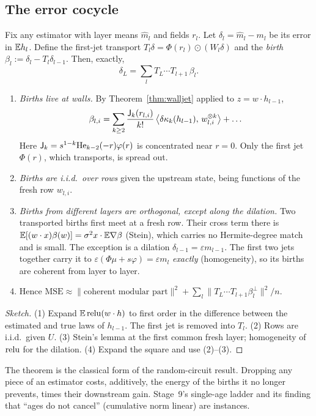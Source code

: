 \subsection{The error cocycle}
Fix any estimator with layer means $\hat m_l$ and fields $r_l$. Let $\delta_l=\hat m_l-m_l$ be its error in $\mathbb E h_l$. Define the first-jet
transport $T_l\delta=\Phi(r_l)\odot(W_l\delta)$ and the \emph{birth} $\beta_l:=\delta_l-T_l\delta_{l-1}$. Then, exactly,
\[
\delta_L=\sum_{l}T_{L}\cdots T_{l+1}\,\beta_l .
\]
\begin{theorem}\label{thm:cocycle}
\begin{enumerate}[leftmargin=*]
\item \emph{Births live at walls.} By Theorem~\ref{thm:walljet} applied to $z=w\cdot h_{l-1}$,
\[
\beta_{l,i}=\sum_{k\ge2}\frac{\mathsf J_k(r_{l,i})}{k!}\,\big\langle\delta\kappa_k(h_{l-1}),\,w_{l,i}^{\otimes k}\big\rangle+\dots
\]
Here $\mathsf J_k=s^{1-k}\mathrm{He}_{k-2}(-r)\varphi(r)$ is concentrated near $r=0$. Only the first jet $\Phi(r)$, which transports, is spread out.
\item \emph{Births are i.i.d.\ over rows} given the upstream state, being functions of the fresh row $w_{l,i}$.
\item \emph{Births from different layers are orthogonal, except along the dilation.} Two transported births first meet at a fresh row.
Their cross term there is $\mathbb E[(w\cdot x)\beta(w)]=\sigma^2x\cdot\mathbb E\nabla\beta$ (Stein), which carries no Hermite-degree match and is
small. The exception is a dilation $\delta_{l-1}=\varepsilon m_{l-1}$. The first two jets together carry it to $\varepsilon(\Phi\mu+s\varphi)=\varepsilon m_l$
\emph{exactly} (homogeneity), so its births are coherent from layer to layer.
\item Hence $\mathrm{MSE}\approx\|\text{coherent modular part}\|^2+\sum_l\|T_{L}\cdots T_{l+1}\beta^\perp_l\|^2/n$.
\end{enumerate}
\end{theorem}
\begin{proof}[Sketch]
(1) Expand $\mathbb E\operatorname{relu}(w\cdot h)$ to first order in the difference between the estimated and true laws of $h_{l-1}$. The first jet is
removed into $T_l$. (2) Rows are i.i.d.\ given $U$. (3) Stein's lemma at the first common fresh layer; homogeneity of $\operatorname{relu}$ for the
dilation. (4) Expand the square and use (2)--(3).
\end{proof}
The theorem is the classical form of the random-circuit result. Dropping any piece of an estimator costs, additively, the energy of the
births it no longer prevents, times their downstream gain. Stage~9's single-age ladder and its finding that ``ages do not cancel''
(cumulative norm linear) are instances.


